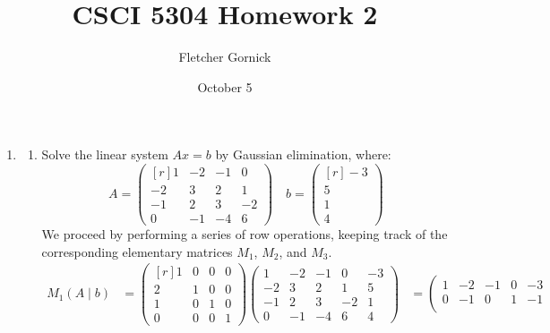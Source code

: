 \documentclass[11pt]{article}
\title{\vspace{-1.0cm}CSCI 5304 Homework 2 }
\author{Fletcher Gornick}
\date{October 5}
\begin{document}
\maketitle
\begin{enumerate}
	\item \begin{enumerate}
		      \item Solve the linear system \(Ax = b\) by Gaussian elimination, where:
		            \[A =
			            \begin{pmatrix*}[r]
				            1  & -2 & -1 & 0  \\
				            -2 & 3  & 2  & 1  \\
				            -1 & 2  & 3  & -2 \\
				            0  & -1 & -4 & 6
			            \end{pmatrix*}
			            \quad b = \begin{pmatrix*}[r] -3 \\ 5 \\ 1 \\ 4 \end{pmatrix*}
		            \]
		            We proceed by performing a series of row operations, keeping track of the corresponding elementary matrices \(M_1\), \(M_2\), and \(M_3\).
		            \begin{align*}
			            M_1 (A \mid b)         & =
			            \begin{pmatrix*}[r]
				            1 & 0 & 0 & 0 \\
				            2 & 1 & 0 & 0 \\
				            1 & 0 & 1 & 0 \\
				            0 & 0 & 0 & 1
			            \end{pmatrix*}
			            \left(\begin{array}{rrrr|r}
					                  1  & -2 & -1 & 0  & -3 \\
					                  -2 & 3  & 2  & 1  & 5  \\
					                  -1 & 2  & 3  & -2 & 1  \\
					                  0  & -1 & -4 & 6  & 4
				                  \end{array}\right)
			                                   & =
			            \left(\begin{array}{rrrr|r}
					                  1 & -2 & -1 & 0  & -3 \\
					                  0 & -1 & 0  & 1  & -1 \\

\end{array}
\end{align*}
\end{enumerate}
\end{enumerate}
\end{document}
